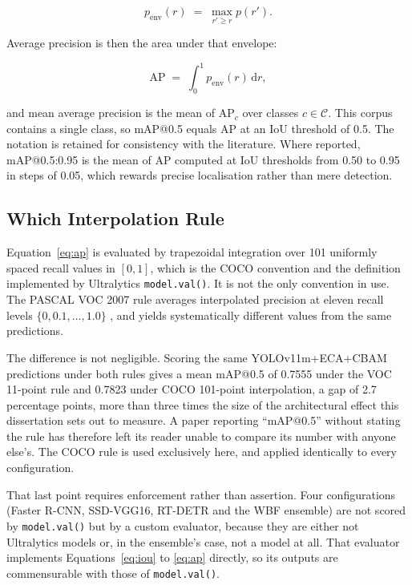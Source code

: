 \documentclass[MScCS]{uccthesis}
\begin{document}
\begin{equation}
   p_{\mathrm{env}}(r) \;=\; \max_{r' \geq r} p(r') .
   \label{eq:envelope}
\end{equation}

Average precision is then the area under that envelope:

\begin{equation}
   \mathrm{AP} \;=\; \int_{0}^{1} p_{\mathrm{env}}(r) \, \mathrm{d}r ,
   \label{eq:ap}
\end{equation}

and mean average precision is the mean of $\mathrm{AP}_c$ over classes
$c \in \mathcal{C}$. This corpus contains a single class, so mAP@0.5 equals
$\mathrm{AP}$ at an IoU threshold of 0.5. The notation is retained for
consistency with the literature. Where reported, mAP@0.5:0.95 is the mean of
$\mathrm{AP}$ computed at IoU thresholds from 0.50 to 0.95 in steps of 0.05,
which rewards precise localisation rather than mere detection.

\subsection{Which Interpolation Rule}

Equation~\eqref{eq:ap} is evaluated by trapezoidal integration over 101
uniformly spaced recall values in $[0, 1]$, which is the COCO convention
\parencite{lin2014microsoft} and the definition implemented by Ultralytics
\texttt{model.val()}. It is not the only convention in use. The PASCAL VOC 2007
rule averages interpolated precision at eleven recall levels
$\{0, 0.1, \ldots, 1.0\}$ \parencite{everingham2010pascal}, and yields
systematically different values from the same predictions.

The difference is not negligible. Scoring the same YOLOv11m+ECA+CBAM
predictions under both rules gives a mean mAP@0.5 of 0.7555 under the VOC
11-point rule and 0.7823 under COCO 101-point interpolation, a gap of 2.7
percentage points, more than three times the size of the architectural effect
this dissertation sets out to measure. A paper reporting ``mAP@0.5'' without
stating the rule has therefore left its reader unable to compare its number
with anyone else's. The COCO rule is used exclusively here, and applied
identically to every configuration.

That last point requires enforcement rather than assertion. Four configurations (Faster R-CNN, SSD-VGG16, RT-DETR and the WBF ensemble) are not scored by
\texttt{model.val()} but by a custom evaluator, because they are either not
Ultralytics models or, in the ensemble's case, not a model at all. That
evaluator implements Equations~\eqref{eq:iou} to \eqref{eq:ap} directly, so its
outputs are commensurable with those of \texttt{model.val()}.
\end{document}

